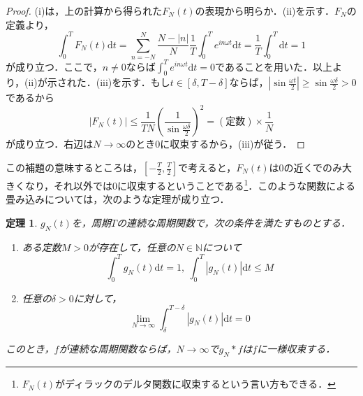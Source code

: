 \documentclass[a4j]{jsbook}
\newtheorem{theorem}{定理}
\numberwithin{theorem}{chapter}  %
\begin{document}
\begin{proof}
(i)は，上の計算から得られた\(F_N(t)\)の表現から明らか．(ii)を示す．\(F_N\)の定義より，
\begin{equation*}
    \int_0^T F_N(t)\mathrm{d}t=\sum_{n=-N}^N\frac{N-|n|}{N}\frac{1}{T}\int_0^T e^{in\omega t}\mathrm{d}t=\frac{1}{T}\int_0^T \mathrm{d}t=1
\end{equation*}
が成り立つ．ここで，\(n\neq 0\)ならば\(\displaystyle\int_0^T e^{in\omega t}\mathrm{d}t=0\)であることを用いた．以上より，(ii)が示された．(iii)を示す．もし\(t\in[\delta, T-\delta]\)ならば，\(\displaystyle\left|\sin\frac{\omega t}{2}\right|\geq\sin\frac{\omega\delta}{2}>0\)であるから
\begin{equation*}
    |F_N(t)|\leq\frac{1}{TN}\left(\frac{1}{\sin\frac{\omega\delta}{2}}\right)^2=(\mbox{定数})\times\frac{1}{N}
\end{equation*}
が成り立つ．右辺は\(N\to\infty\)のとき0に収束するから，(iii)が従う．
\end{proof}
この補題の意味するところは，\(\displaystyle \left[-\frac{T}{2}, \frac{T}{2}\right]\)で考えると，\(F_N(t)\)は0の近くでのみ大きくなり，それ以外では0に収束するということである\footnote{\(F_N(t)\)がディラックのデルタ関数に収束するという言い方もできる．}．このような関数による畳み込みについては，次のような定理が成り立つ．
\begin{theorem}
\label{th2-14}
\(g_N(t)\)を，周期\(T\)の連続な周期関数で，次の条件を満たすものとする．
\begin{enumerate}
    \renewcommand{\labelenumi}{\arabic{enumi})}
    \item ある定数\(M>0\)が存在して，任意の\(N\in\mathbb{N}\)について
    \begin{equation*}
        \int_0^T g_N(t)\mathrm{d}t=1,\ \int_0^T |g_N(t)|\mathrm{d}t\leq M
    \end{equation*}
    \item 任意の\(\delta>0\)に対して，
    \begin{equation*}
        \lim_{N\to\infty}\int_\delta^{T-\delta}|g_N(t)|\mathrm{d}t=0
    \end{equation*}
\end{enumerate}
このとき，\(f\)が連続な周期関数ならば，\(N\to\infty\)で\(g_N*f\)は\(f\)に一様収束する．
\end{theorem}
\end{document}
